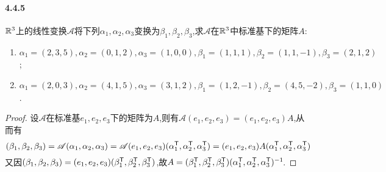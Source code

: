 \documentclass[11pt]{article}
\begin{document}
\paragraph{4.4.5}$\mathbb{R}^3$上的线性变换$\mathscr{A}$将下列$\alpha_1,\alpha_2,\alpha_3$变换为$\beta_1,\beta_2,\beta_3$,求$\mathscr{A}$在$\mathbb{R}^3$中标准基下的矩阵$A$:
\begin{enumerate}
    \item $\alpha_1 = (2,3,5), \alpha_2 = (0,1,2), \alpha_3 = (1,0,0), \beta_1 = (1,1, 1), \beta_2 = (1,1, -1), \beta_3 = (2, 1, 2)$;
    \item $\alpha_1 = (2,0,3), \alpha_2 = (4,1,5), \alpha_3 = (3,1, 2), \beta_1 = (1,2, -1), \beta_2 = (4,5, -2), \beta_3 = (1,1,0)$.
\end{enumerate}
\begin{proof}
    设$\mathscr{A}$在标准基$e_1,e_2,e_3$下的矩阵为$A$,则有$\mathscr{A}(e_1,e_2,e_3)=(e_1,e_2,e_3)A$,从而有
    $$(\beta_1,\beta_2,\beta_3)=\mathscr{A}(\alpha_1,\alpha_2,\alpha_3)=\mathscr{A}(e_1,e_2,e_3)(\alpha_1^{\mathsf{T}},\alpha_2^{\mathsf{T}},\alpha_3^{\mathsf{T}})=(e_1,e_2,e_3)A(\alpha_1^{\mathsf{T}},\alpha_2^{\mathsf{T}},\alpha_3^{\mathsf{T}})$$
    又因$(\beta_1,\beta_2,\beta_3)=(e_1,e_2,e_3)(\beta_1^{\mathsf{T}},\beta_2^{\mathsf{T}},\beta_3^{\mathsf{T}})$,故$A= (\beta_1^{\mathsf{T}},\beta_2^{\mathsf{T}},\beta_3^{\mathsf{T}})(\alpha_1^{\mathsf{T}},\alpha_2^{\mathsf{T}},\alpha_3^{\mathsf{T}})^{-1}\!$.


\end{proof}
\end{document}
